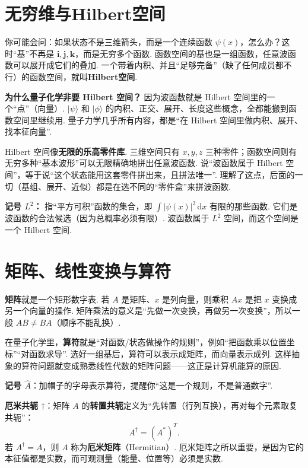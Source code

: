 \documentclass[UTF8,11pt,a4paper,openany]{ctexbook}
\newcommand{\ket}[1]{\lvert #1\rangle}\newcommand{\bra}[1]{\langle #1\rvert}
\newcommand{\dd}{\,\mathrm d}\newcommand{\Ham}{\hat H}\newcommand{\tr}{\operatorname{Tr}}
\newcommand{\term}[1]{\textbf{#1}}
\begin{document}
\section{无穷维与Hilbert空间}
你可能会问：如果状态不是三维箭头，而是一个连续函数 $\psi(x)$，怎么办？这时“基”不再是 $\mathbf i,\mathbf j,\mathbf k$，而是无穷多个函数. 函数空间的基也是一组函数，任意波函数可以展开成它们的叠加. 一个带着内积、并且“足够完备”（缺了任何成员都不行）的函数空间，就叫\term{Hilbert空间}. 

\textbf{为什么量子化学非要 Hilbert 空间？} 因为波函数就是 Hilbert 空间里的一个“点”（向量）. $\ket\psi$ 和 $\ket\phi$ 的内积、正交、展开、长度这些概念，全都能搬到函数空间里继续用. 量子力学几乎所有内容，都是“在 Hilbert 空间里做内积、展开、找本征向量”. 

\begin{analogybox}
Hilbert 空间像\textbf{无限的乐高零件库}. 三维空间只有 $x,y,z$ 三种零件；函数空间则有无穷多种“基本波形”可以无限精确地拼出任意波函数. 说“波函数属于 Hilbert 空间”，等于说“这个状态能用这套零件拼出来，且拼法唯一”. 理解了这点，后面的一切（基组、展开、近似）都是在选不同的“零件盒”来拼波函数. 
\end{analogybox}

\begin{notationbox}
\textbf{记号 $L^2$：} 指“平方可积”函数的集合，即 $\int|\psi(x)|^2\dd x$ 有限的那些函数. 它们是波函数的合法候选（因为总概率必须有限）. 波函数属于 $L^2$ 空间，而这个空间是一个 Hilbert 空间. 
\end{notationbox}

\section{矩阵、线性变换与算符}
\label{sec:matrices}
\term{矩阵}就是一个矩形数字表. 若 $A$ 是矩阵、$x$ 是列向量，则乘积 $Ax$ 是把 $x$ 变换成另一个向量的操作. 矩阵乘法的意义是“先做一次变换，再做另一次变换”，所以一般 $AB\ne BA$（顺序不能乱换）. 

在量子化学里，\term{算符}就是“对函数/状态做操作的规则”，例如“把函数乘以位置坐标”“对函数求导”. 选好一组基后，算符可以表示成矩阵，而向量表示成列. 这样抽象的算符问题就变成熟悉线性代数的矩阵问题——这正是计算机能算的原因. 

\textbf{记号 $\hat A$}：加帽子的字母表示算符，提醒你“这是一个规则，不是普通数字”. 

\textbf{厄米共轭 $\dagger$}：矩阵 $A$ 的\term{转置共轭}定义为“先转置（行列互换），再对每个元素取复共轭”：
\[
A^\dagger=(A^*)^T.
\]
若 $A^\dagger=A$，则 $A$ 称为\term{厄米矩阵}（Hermitian）. 厄米矩阵之所以重要，是因为它的本征值都是实数，而可观测量（能量、位置等）必须是实数. 
\end{document}
